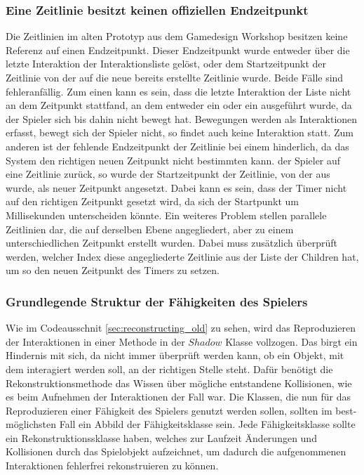 \subsubsection{Eine Zeitlinie besitzt keinen offiziellen Endzeitpunkt}
Die Zeitlinien im alten Prototyp aus dem Gamedesign Workshop besitzen keine Referenz auf einen Endzeitpunkt. Dieser Endzeitpunkt wurde entweder über die letzte Interaktion der Interaktionsliste gelöst, oder dem Startzeitpunkt der Zeitlinie von der auf die neue bereits erstellte Zeitlinie  wurde. Beide Fälle sind fehleranfällig. Zum einen kann es sein, dass die letzte Interaktion der Liste nicht an dem Zeitpunkt stattfand, an dem entweder ein  oder ein  ausgeführt wurde, da der Spieler sich bis dahin nicht bewegt hat. Bewegungen werden als Interaktionen erfasst, bewegt sich der Spieler nicht, so findet auch keine Interaktion statt. Zum anderen ist der fehlende Endzeitpunkt der Zeitlinie bei einem  hinderlich, da das System den richtigen neuen Zeitpunkt nicht bestimmten kann.  der Spieler auf eine Zeitlinie zurück, so wurde der Startzeitpunkt der Zeitlinie, von der aus  wurde, als neuer Zeitpunkt angesetzt. Dabei kann es sein, dass der Timer nicht auf den richtigen Zeitpunkt gesetzt wird, da sich der Startpunkt um Millisekunden unterscheiden könnte. Ein weiteres Problem stellen parallele Zeitlinien dar, die auf derselben Ebene angegliedert, aber zu einem unterschiedlichen Zeitpunkt erstellt wurden. Dabei muss zusätzlich überprüft werden, welcher Index diese angegliederte Zeitlinie aus der Liste der Children hat, um so den neuen Zeitpunkt des Timers zu setzen.

\subsubsection{Grundlegende Struktur der Fähigkeiten des Spielers}
Wie im Codeausschnit \ref{sec:reconstructing_old} zu sehen, wird das Reproduzieren der Interaktionen in einer Methode in der $Shadow$ Klasse vollzogen. Das birgt ein Hindernis mit sich, da nicht immer überprüft werden kann, ob ein Objekt, mit dem interagiert werden soll, an der richtigen Stelle steht. Dafür benötigt die Rekonstruktionsmethode das Wissen über mögliche entstandene Kollisionen, wie es beim Aufnehmen der Interaktionen der Fall war. Die Klassen, die nun für das Reproduzieren einer Fähigkeit des Spielers genutzt werden sollen, sollten im best-möglichsten Fall ein Abbild der Fähigkeitsklasse sein. Jede Fähigkeitsklasse sollte ein Rekonstruktionssklasse haben, welches zur Laufzeit Änderungen und Kollisionen durch das Spielobjekt aufzeichnet, um dadurch die aufgenommenen Interaktionen fehlerfrei rekonstruieren zu können.

